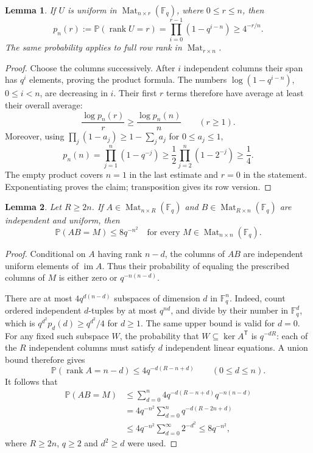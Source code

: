\documentclass[11pt]{article}
\newtheorem{lemma}{Lemma}
\newcommand{\Mat}{\operatorname{Mat}}
\newcommand{\rank}{\operatorname{rank}}
\begin{document}
\begin{lemma}\label{conditioning}
If $U$ is uniform in $\Mat_{n\times r}(\mathbb F_q)$, where $0\le r\le n$,
then
\[
 p_n(r):=\mathbb P(\rank U=r)
 =\prod_{i=0}^{r-1}(1-q^{i-n})\ge4^{-r/n}.
\]
The same probability applies to full row rank in $\Mat_{r\times n}$.
\end{lemma}
\begin{proof}
Choose the columns successively. After $i$ independent columns their
span has $q^i$ elements, proving the product formula.
The numbers $\log(1-q^{i-n})$, $0\le i<n$, are decreasing in $i$.
Their first $r$ terms therefore have average at least their overall average:
\[
 \frac{\log p_n(r)}r\ge\frac{\log p_n(n)}n\qquad(r\ge1).
\]
Moreover, using $\prod_j(1-a_j)\ge1-\sum_j a_j$ for $0\le a_j\le1$,
\[
 p_n(n)=\prod_{j=1}^n(1-q^{-j})
 \ge\frac12\prod_{j=2}^n(1-2^{-j})\ge\frac14.
\]
The empty product covers $n=1$ in the last estimate and $r=0$ in the
statement. Exponentiating proves the claim; transposition gives its row version.
\end{proof}

\begin{lemma}\label{product}
Let $R\ge2n$. If $A\in\Mat_{n\times R}(\mathbb F_q)$ and
$B\in\Mat_{R\times n}(\mathbb F_q)$ are independent and uniform, then
\[
 \mathbb P(AB=M)\le8q^{-n^2}
 \quad\text{for every }M\in\Mat_{n\times n}(\mathbb F_q).
\]
\end{lemma}
\begin{proof}
Conditional on $A$ having rank $n-d$, the columns of $AB$ are
independent uniform elements of $\operatorname{im}A$.
Thus their probability of equaling the prescribed columns of $M$ is
either zero or $q^{-n(n-d)}$.

There are at most $4q^{d(n-d)}$ subspaces of dimension $d$ in
$\mathbb F_q^n$. Indeed, count ordered independent $d$-tuples by at most
$q^{nd}$, and divide by their number in $\mathbb F_q^d$, which is
$q^{d^2}p_d(d)\ge q^{d^2}/4$ for $d\ge1$.
The same upper bound is valid for $d=0$.
For any fixed such subspace $W$, the probability that $W\subseteq\ker A^{\mathsf T}$
is $q^{-dR}$: each of the $R$ independent columns must satisfy $d$
independent linear equations. A union bound therefore gives
\[
 \mathbb P(\rank A=n-d)
 \le4q^{-d(R-n+d)}\qquad(0\le d\le n).
\]
It follows that
\begin{align*}
 \mathbb P(AB=M)
 &\le\sum_{d=0}^n4q^{-d(R-n+d)}q^{-n(n-d)}\\
 &=4q^{-n^2}\sum_{d=0}^n q^{-d(R-2n+d)}\\
 &\le4q^{-n^2}\sum_{d=0}^{\infty}2^{-d^2}
 \le8q^{-n^2},
\end{align*}
where $R\ge2n$, $q\ge2$ and $d^2\ge d$ were used.
\end{proof}
\end{document}
